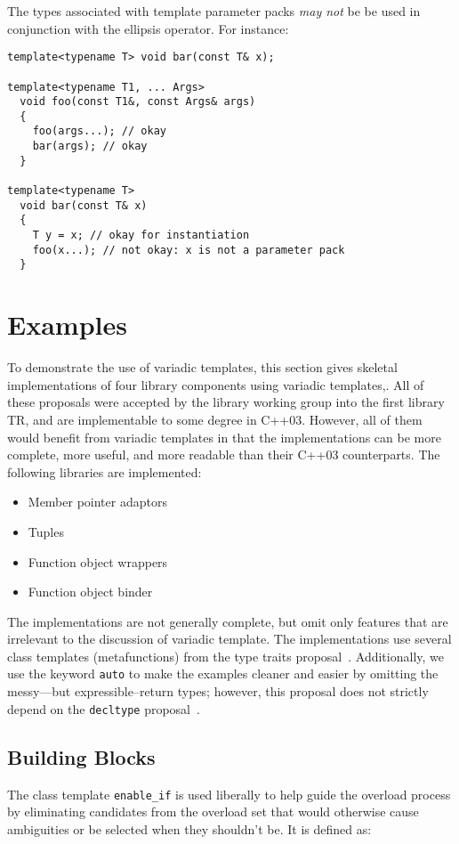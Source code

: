 \documentclass{article}
\begin{document}
The types associated with template parameter packs \textit{may not} be
be used in conjunction with the ellipsis operator. For instance:

\begin{verbatim}
template<typename T> void bar(const T& x);

template<typename T1, ... Args>
  void foo(const T1&, const Args& args)
  { 
    foo(args...); // okay
    bar(args); // okay
  }

template<typename T> 
  void bar(const T& x)
  {
    T y = x; // okay for instantiation
    foo(x...); // not okay: x is not a parameter pack
  }
\end{verbatim}

\section{Examples}
To demonstrate the use of variadic templates, this section gives
skeletal implementations of four library components using variadic
templates,. All of these proposals were accepted by the library
working group into the first library TR, and are implementable to some
degree in C++03. However, all of them would benefit from variadic
templates in that the implementations can be more complete, more
useful, and more readable than their C++03 counterparts. The following
libraries are implemented:

\begin{itemize}
\item Member pointer adaptors~\cite{Dimov03a}
\item Tuples~\cite{Jarvi02}
\item Function object wrappers~\cite{Gregor02}
\item Function object binder~\cite{Dimov03b}
\end{itemize}

The implementations are not generally complete, but omit only features
that are irrelevant to the discussion of variadic template. The
implementations use several class templates (metafunctions) from the
type traits proposal~\cite{Maddock03}. Additionally, we use the
keyword {\tt auto} to make the examples cleaner and easier by omitting
the messy---but expressible--return types; however, this proposal does
not strictly depend on the {\tt decltype} proposal~\cite{Jarvi03}.

\subsection{Building Blocks}
\label{building_blocks}
The class template {\tt enable\_if} is used liberally to help guide
the overload process by eliminating candidates from the overload set
that would otherwise cause ambiguities or be selected when they
shouldn't be. It is defined as:
\end{document}
